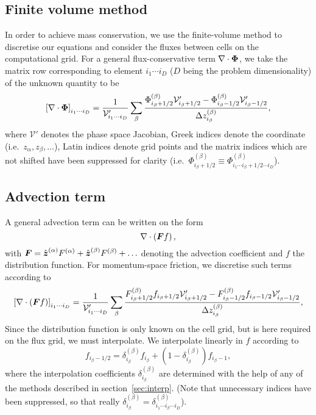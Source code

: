 \documentclass{notes}
\newcommand{\Vp}{\mathcal{V}'}
\begin{document}
    \subsection{Finite volume method}
    In order to achieve mass conservation, we use the finite-volume method to
    discretise our equations and consider the fluxes between cells on the
    computational grid. For a general flux-conservative term
    $\nabla\cdot\boldsymbol{\Phi}$, we take the matrix row corresponding to element
    $i_1\cdots i_D$ ($D$ being the problem dimensionality) of the unknown
    quantity to be
    \begin{equation}
        \left[ \nabla\cdot\bb{\Phi} \right]_{i_1\cdots i_D}  =
            \frac{1}{\Vp_{i_1\cdots i_D}}\sum_\beta \frac{
                \Phi^{(\beta)}_{i_\beta+1/2} \Vp_{i_\beta+1/2} -
                \Phi^{(\beta)}_{i_\beta-1/2} \Vp_{i_\beta-1/2}
            }{\Delta z^{(\beta)}_{i_\beta}},
    \end{equation}
    where $\Vp$ denotes the phase space Jacobian, Greek indices denote the
    coordinate (i.e.\ $z_\alpha, z_\beta, \ldots$), Latin indices denote grid
    points and the matrix indices which are not shifted have been suppressed for
    clarity (i.e.\
    $\Phi^{(\beta)}_{i_\beta+1/2}\equiv\Phi^{(\beta)}_{i_1\cdots i_\beta+1/2\cdots i_D}$).

    \subsection{Advection term}\label{sec:advection}
    A general advection term can be written on the form
    \begin{equation*}
        \nabla\cdot\left( \boldsymbol{F} f \right),
    \end{equation*}
    with $\boldsymbol{F} = \hat{\boldsymbol{z}}^{(\alpha)}F^{(\alpha)} + \hat{\boldsymbol{z}}^{(\beta)}F^{(\beta)}+\ldots$
    denoting the advection coefficient and $f$ the distribution function. For
    momentum-space friction, we discretise such terms according to
    \begin{equation}\label{eq:advection:discr}
        \left[\nabla\cdot\left( \bb{F}f \right) \right]_{i_1\cdots i_D} =
            \frac{1}{\Vp_{i_1\cdots i_D}}\sum_\beta \frac{
                F^{(\beta)}_{i_\beta+1/2}f_{i_\beta+1/2} \Vp_{i_\beta+1/2} -
                F^{(\beta)}_{i_\beta-1/2}f_{i_\beta-1/2} \Vp_{i_\beta-1/2}
            }{\Delta z^{(\beta)}_{i_\beta}},
    \end{equation}
    Since the distribution function is only known on the cell grid, but is here
    required on the flux grid, we must interpolate. We interpolate linearly in
    $f$ according to
    \begin{equation}
        f_{i_\beta-1/2} = \delta^{(\beta)}_{i_\beta} f_{i_\beta} + \left( 1 - \delta^{(\beta)}_{i_\beta} \right) f_{i_\beta-1},
    \end{equation}
    where the interpolation coefficients $\delta^{(\beta)}_{i_\beta}$ are
    determined with the help of any of the methods described in
    section~\ref{sec:interp}. (Note that unnecessary indices have been
    suppressed, so that really
    $\delta^{(\beta)}_{i_\beta} = \delta^{(\beta)}_{i_1\cdots i_\beta\cdots i_D}$).
\end{document}
